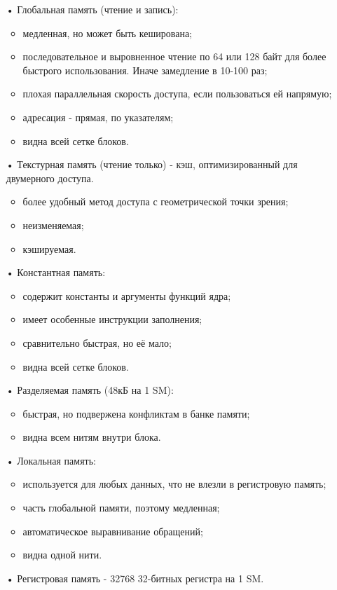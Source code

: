 \documentclass[a4paper,14pt,russian]{extreport}
\begin{document}
\begin{itemize}
\item[•] Глобальная память (чтение и запись):
  \begin{itemize}
  \item медленная, но может быть кеширована;
  \item последовательное и выровненное чтение по 64 или 128 байт для более быстрого использования. Иначе замедление в 10-100 раз;
  \item плохая параллельная скорость доступа, если пользоваться ей напрямую;
  \item адресация - прямая, по указателям;
  \item видна всей сетке блоков. 
  \end{itemize}
\item[•] Текстурная память (чтение только) - кэш, оптимизированный для двумерного доступа.
  \begin{itemize}
  \item более удобный метод доступа с геометрической точки зрения;
  \item неизменяемая;
  \item кэшируемая.
  \end{itemize}
\item[•] Константная память:
  \begin{itemize}
  \item содержит константы и аргументы функций ядра;
  \item имеет особенные инструкции заполнения;
  \item сравнительно быстрая, но её мало;
  \item видна всей сетке блоков. 
  \end{itemize}
\item[•] Разделяемая память (48кБ на 1 SM):
  \begin{itemize}
  \item быстрая, но подвержена конфликтам в банке памяти;
  \item видна всем нитям внутри блока.
  \end{itemize}
\item[•] Локальная память:
  \begin{itemize}
  \item используется для любых данных, что не влезли в регистровую память;
  \item часть глобальной памяти, поэтому медленная;
  \item автоматическое выравнивание обращений;
  \item видна одной нити.
  \end{itemize}
\item[•] Регистровая память - 32768 32-битных регистра на 1 SM.
\end{itemize}
\end{document}
